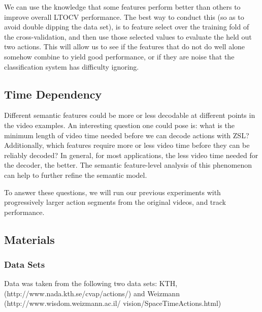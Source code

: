 \documentclass{article}
\begin{document}
We can use the knowledge that some features perform better than others to improve overall LTOCV performance.  The best way to conduct this (so as to avoid double dipping the data set), is to feature select over the training fold of the cross-validation, and then use those selected values to evaluate the held out two actions. This will allow us to see if the features that do not do well alone somehow combine to yield good performance, or if they are noise that the classification system has difficulty ignoring.
\label{fcomp}
\subsection{Time Dependency}
Different semantic features could be more or less decodable at different points in the video examples. An interesting question one could pose is: what is the minimum length of video time needed before we can decode actions with ZSL? Additionally, which features require more or less video time before they can be reliably decoded? In general, for most applications, the less video time needed for the decoder, the better.  The semantic feature-level analysis of this phenomenon can help to further refine the semantic model.

To answer these questions, we will run our previous experiments with progressively larger action segments from the original videos, and track performance.
\label{time}
\subsection{Materials}
\subsubsection{Data Sets}
Data was taken from the following two data sets: KTH, (http://www.nada.kth.se/cvap/actions/) and Weizmann (http://www.wisdom.weizmann.ac.il/\texttildelow
vision/SpaceTimeActions.html)
\end{document}
